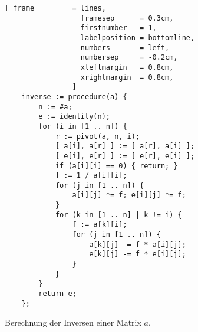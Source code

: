 \begin{figure}[!ht]
\centering
\begin{Verbatim}[ frame         = lines, 
                  framesep      = 0.3cm, 
                  firstnumber   = 1,
                  labelposition = bottomline,
                  numbers       = left,
                  numbersep     = -0.2cm,
                  xleftmargin   = 0.8cm,
                  xrightmargin  = 0.8cm,
                ]
    inverse := procedure(a) {
        n := #a;              
        e := identity(n);
        for (i in [1 .. n]) {
            r := pivot(a, n, i);
            [ a[i], a[r] ] := [ a[r], a[i] ];   
            [ e[i], e[r] ] := [ e[r], e[i] ];
            if (a[i][i] == 0) { return; }
            f := 1 / a[i][i]; 
            for (j in [1 .. n]) {
                a[i][j] *= f; e[i][j] *= f;
            }
            for (k in [1 .. n] | k != i) {
                f := a[k][i];
                for (j in [1 .. n]) {
                    a[k][j] -= f * a[i][j];
                    e[k][j] -= f * e[i][j];
                }
            }    
        }
        return e;
    };
\end{Verbatim}
\vspace*{-0.3cm}
\caption{Berechnung der Inversen einer Matrix $a$.}
\label{fig:inverse.stlx}
\end{figure}

